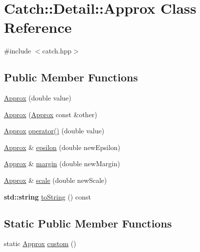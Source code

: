 \hypertarget{class_catch_1_1_detail_1_1_approx}{}\section{Catch\+:\+:Detail\+:\+:Approx Class Reference}
\label{class_catch_1_1_detail_1_1_approx}


{\ttfamily \#include $<$catch.\+hpp$>$}

\subsection*{Public Member Functions}
\begin{DoxyCompactItemize}
\item 
\hyperlink{class_catch_1_1_detail_1_1_approx_a1a8618ea8db08c66bd3d9fe8f74b957a}{Approx} (double value)
\item 
\hyperlink{class_catch_1_1_detail_1_1_approx_a807330c63266fc914abdf6e461255a54}{Approx} (\hyperlink{class_catch_1_1_detail_1_1_approx}{Approx} const \&other)
\item 
\hyperlink{class_catch_1_1_detail_1_1_approx}{Approx} \hyperlink{class_catch_1_1_detail_1_1_approx_a48c9cbc28a05dc9dc8c3973b9eae2268}{operator()} (double value)
\item 
\hyperlink{class_catch_1_1_detail_1_1_approx}{Approx} \& \hyperlink{class_catch_1_1_detail_1_1_approx_a05c50c3ad0a971fab19345b5d94979a9}{epsilon} (double new\+Epsilon)
\item 
\hyperlink{class_catch_1_1_detail_1_1_approx}{Approx} \& \hyperlink{class_catch_1_1_detail_1_1_approx_a82f7049b41c16e6234275641fad22218}{margin} (double new\+Margin)
\item 
\hyperlink{class_catch_1_1_detail_1_1_approx}{Approx} \& \hyperlink{class_catch_1_1_detail_1_1_approx_acd80f0737bf38112beacd5ca95bef113}{scale} (double new\+Scale)
\item 
\textbf{ std\+::string} \hyperlink{class_catch_1_1_detail_1_1_approx_a972fd9ac60607483263f1b0f0f9955e6}{to\+String} () const
\end{DoxyCompactItemize}
\subsection*{Static Public Member Functions}
\begin{DoxyCompactItemize}
\item 
static \hyperlink{class_catch_1_1_detail_1_1_approx}{Approx} \hyperlink{class_catch_1_1_detail_1_1_approx_aaf86dc0ee92272ac2d9839197a07951d}{custom} ()
\end{DoxyCompactItemize}
